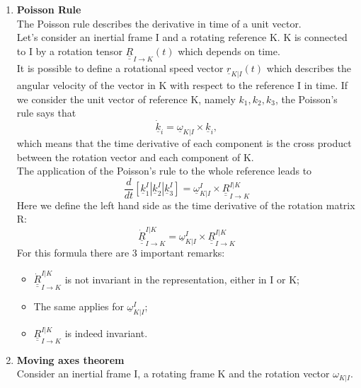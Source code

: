 \begin{enumerate}
    \item \textbf{Poisson Rule}\\
    The Poisson rule describes the derivative in time of a unit vector. \\
    Let's consider an inertial frame I and a rotating reference K. K is connected to I by a rotation tensor $\underline{\underline{R}}_{I\to K}(t) $ which depends on time.
    \\
    It is possible to define a rotational speed vector $\underline{r}_{K|I}(t) $ which describes the angular velocity of the vector in K with respect to the reference I in time.
    If we consider the unit vector of reference K, namely $k_1, k_2, k_3$, the Poisson's rule says that
    \begin{equation}
    \underline{\dot k}_i = \underline{\omega}_{K|I}\times \underline{k}_i,
    \end{equation}
    which means that the time derivative of each component is the cross product between the rotation vector and each component of K.
    \\
    The application of the Poisson's rule to the whole reference leads to 
    \begin{equation}
        \frac{d}{dt}\left[\underline{k}_1^I|\underline{k}_2^I|\underline{k}_3^I\right] = \underline{\omega}_{K|I}^I\times \underline{\underline{R}}_{I\to K}^{I|K}
    \end{equation}
    Here we define the left hand side as the time derivative of the rotation matrix R:
    \begin{equation}
        \boxed{\underline{\underline{\dot R}}_{I\to K}^{I|K} = \underline{\omega}_{K|I}^I\times \underline{\underline{R}}_{I\to K}^{I|K}}
    \end{equation}
    For this formula there are 3 important remarks:
    \begin{itemize}
        \item $\underline{\underline{\dot R}}_{I\to K}^{I|K}$ is not invariant in the representation, either in I or K;
        \item The same applies for $\underline{\omega}_{K|I}^I$;
        \item $\underline{\underline{R}}_{I\to K}^{I|K}$ is indeed invariant.
    \end{itemize}
    \item \textbf{Moving axes theorem}\\
        Consider an inertial frame I, a rotating frame K and the rotation vector $\omega_{K|I}$.

\end{enumerate}
